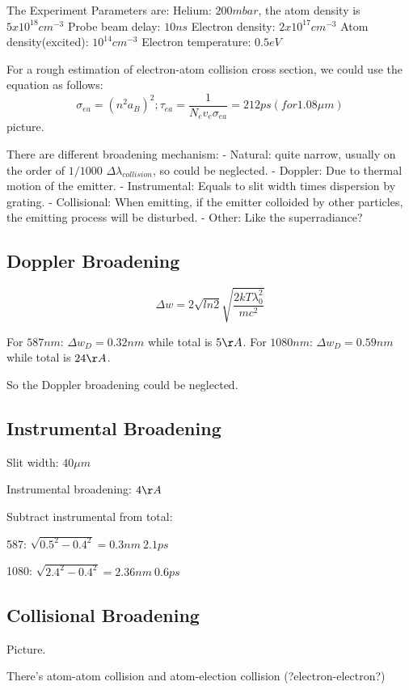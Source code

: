 The Experiment Parameters are:
Helium: $200mbar$, the atom density is $5x10^{18}cm^{-3}$
Probe beam delay: $10ns$
Electron density: $2x10^{17}cm^{-3}$
Atom density(excited): $10^{14}cm^{-3}$
Electron temperature: $0.5eV$

For a rough estimation of electron-atom collision cross section, we
could use the equation as follows:
\begin{equation}
\sigma_{ea} = (n^2a_B)^2; \tau_{ea}=\frac{1}{N_e v_e \sigma_{ea}} =
212 ps (for 1.08 \mu m)
\end{equation}
picture.

There are different broadening mechanism:
- Natural: quite narrow, usually on the order of $1/1000$ $\Delta
\lambda_{collision}$, so could be neglected.
- Doppler: Due to thermal motion of the emitter.
- Instrumental: Equals to slit width times dispersion by grating.
- Collisional: When emitting, if the emitter colloided by other
particles, the emitting process will be disturbed.
- Other: Like the superradiance?

\subsection{Doppler Broadening}
\begin{equation}
\Delta w = 2 \sqrt{ln2} \sqrt{ \frac{2kT \lambda^2_0}{mc^2} }
\end{equation}

For $587nm$: $\Delta w_D = 0.32 nm$ while total is $5 \AA$.
For $1080nm$: $\Delta w_D = 0.59 nm$ while total is $24 \AA$.

So the Doppler broadening could be neglected.

\subsection{Instrumental Broadening}
Slit width: $40\mu m$

Instrumental broadening: $4 \AA$

Subtract instrumental from total:

587: $\sqrt{0.5^2-0.4^2} = 0.3 nm ~ 2.1 ps$

1080: $\sqrt{2.4^2-0.4^2} = 2.36 nm ~ 0.6 ps$

\subsection{Collisional Broadening}
Picture.

There's atom-atom collision and atom-election collision
(?electron-electron?)

